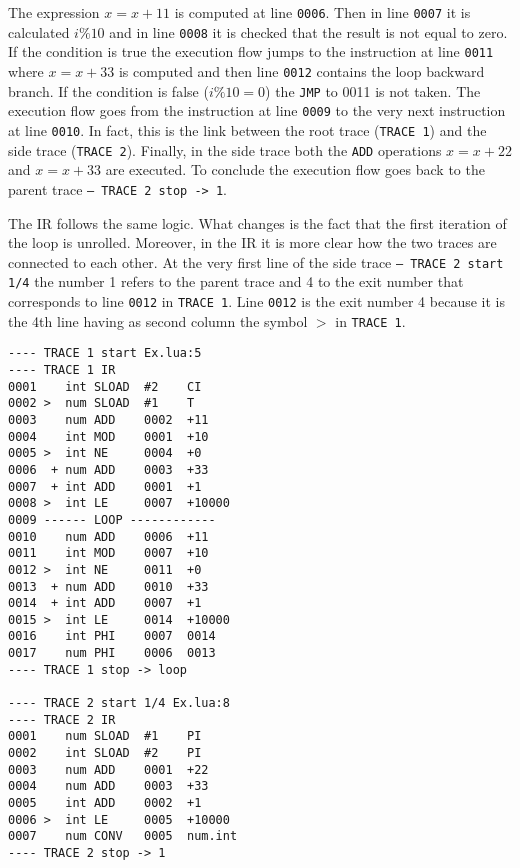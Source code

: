 \noindent
The expression $x=x+11$ is computed at line \texttt{0006}. Then in line \texttt{0007} it is calculated $i\%10$ and in line \texttt{0008} it is checked that the result is not equal to zero. If the condition is true the execution flow jumps to the instruction at line \texttt{0011} where $x=x+33$ is computed and then line \texttt{0012} contains the loop backward branch. If the condition is false ($i\%10 = 0$) the \texttt{JMP} to 0011 is not taken. The execution flow goes from the instruction at line \texttt{0009} to the very next instruction at line \texttt{0010}. In fact, this is the link between the root trace (\texttt{TRACE 1}) and the side trace (\texttt{TRACE 2}). Finally, in the side trace both the \texttt{ADD} operations $x=x+22$ and $x=x+33$ are executed. To conclude the execution flow goes back to the parent trace \texttt{-- TRACE 2 stop -> 1}.

The IR follows the same logic. What changes is the fact that the first iteration of the loop is unrolled. Moreover, in the IR it is more clear how the two traces are connected to each other. At the very first line of the side trace \texttt{-- TRACE 2 start 1/4} the number 1 refers to the parent trace and 4 to the exit number that corresponds to line \texttt{0012} in \texttt{TRACE 1}. Line \texttt{0012} is the exit number 4 because it is the 4th line having as second column the symbol $>$ in \texttt{TRACE 1}.

\begin{multicols}{2}
\begin{lstlisting}[style=DumpStyle]
---- TRACE 1 start Ex.lua:5
---- TRACE 1 IR
0001    int SLOAD  #2    CI
0002 >  num SLOAD  #1    T
0003    num ADD    0002  +11 
0004    int MOD    0001  +10 
0005 >  int NE     0004  +0  
0006  + num ADD    0003  +33 
0007  + int ADD    0001  +1  
0008 >  int LE     0007  +10000
0009 ------ LOOP ------------
0010    num ADD    0006  +11 
0011    int MOD    0007  +10 
0012 >  int NE     0011  +0  
0013  + num ADD    0010  +33 
0014  + int ADD    0007  +1  
0015 >  int LE     0014  +10000
0016    int PHI    0007  0014
0017    num PHI    0006  0013
---- TRACE 1 stop -> loop

---- TRACE 2 start 1/4 Ex.lua:8
---- TRACE 2 IR
0001    num SLOAD  #1    PI
0002    int SLOAD  #2    PI
0003    num ADD    0001  +22 
0004    num ADD    0003  +33 
0005    int ADD    0002  +1  
0006 >  int LE     0005  +10000
0007    num CONV   0005  num.int
---- TRACE 2 stop -> 1
\end{lstlisting}
\end{multicols}

